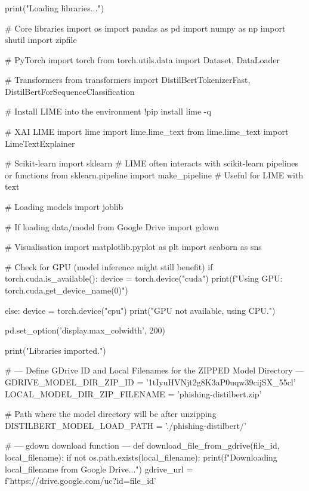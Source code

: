 \subsubsection*{}

\begin{ffcode}

print("Loading libraries...")

# Core libraries
import os
import pandas as pd
import numpy as np
import shutil
import zipfile

# PyTorch
import torch
from torch.utils.data import Dataset, DataLoader

# Transformers
from transformers import DistilBertTokenizerFast, DistilBertForSequenceClassification

# Install LIME into the environment
!pip install lime -q

# XAI LIME
import lime
import lime.lime_text
from lime.lime_text import LimeTextExplainer

# Scikit-learn
import sklearn # LIME often interacts with scikit-learn pipelines or functions
from sklearn.pipeline import make_pipeline # Useful for LIME with text

# Loading models
import joblib

# If loading data/model from Google Drive
import gdown

# Visualisation
import matplotlib.pyplot as plt
import seaborn as sns

# Check for GPU (model inference might still benefit)
if torch.cuda.is_available():
    device = torch.device("cuda")
    print(f"Using GPU: {torch.cuda.get_device_name(0)}")

else:
    device = torch.device("cpu")
    print("GPU not available, using CPU.")

pd.set_option('display.max_colwidth', 200)

print("Libraries imported.")

# --- Define GDrive ID and Local Filenames for the ZIPPED Model Directory ---
GDRIVE_MODEL_DIR_ZIP_ID = '1tIyuHVNjt2g8K3aP0uqw39cijSX_55cl'
LOCAL_MODEL_DIR_ZIP_FILENAME = 'phishing-distilbert.zip'

# Path where the model directory will be after unzipping
DISTILBERT_MODEL_LOAD_PATH = './phishing-distilbert/'

# --- gdown download function ---
def download_file_from_gdrive(file_id, local_filename):
    if not os.path.exists(local_filename):
        print(f"Downloading {local_filename} from Google Drive...")
        gdrive_url = f'https://drive.google.com/uc?id={file_id}'


\end{ffcode}
